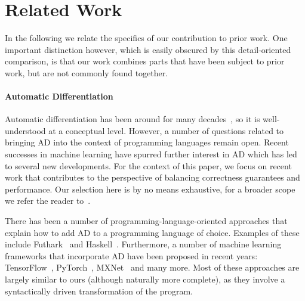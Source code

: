 \section{Related Work\label{sec:relatedwork}}

In the following we relate the specifics of our contribution to prior
work. One important distinction however, which is easily obscured by
this detail-oriented comparison, is that our work combines parts that
have been subject to prior work, but are not commonly found together.

\paragraph{Automatic Differentiation}

Automatic differentiation has been around for many decades~\cite{early-ad1, early-ad2},
so it is well-understood at a conceptual level.  However,
a number of questions related to bringing AD into the context of
programming languages remain open.  Recent successes in machine learning
have spurred further interest in AD which has led to several new developments.
For the context of this paper, we focus on recent work that contributes to 
the perspective of balancing correctness guarantees and performance.
Our selection here is by no means exhaustive, for
a broader scope we refer the reader to~\cite{autodiff-survey}.

There has been a number of programming-language-oriented approaches that explain
how to add AD to a programming language of choice. Examples of these include
Futhark~\cite{futhark/sc22ad} and Haskell~\cite{ad-haskell}.
%
Furthermore, a number of machine learning
frameworks that incorporate AD have been proposed in recent years: TensorFlow~\cite{ad-tf},
PyTorch~\cite{ad-pytorch}, MXNet~\cite{ad-mxnet} and many more.
%
Most of these approaches are largely similar to ours (although naturally more
complete), as they involve a syntactically driven transformation of the program.

